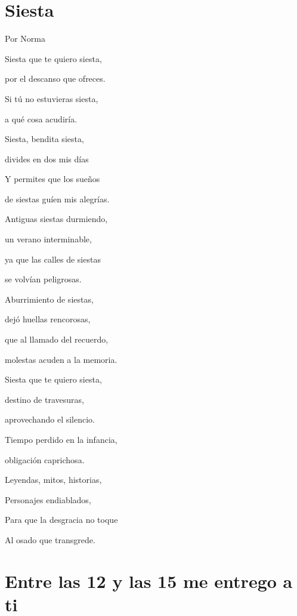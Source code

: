 \documentclass[11pt,twoside,openright,a5paper]{book}
\begin{document}
\section*{Siesta}

                                                                                                                   \begin{flushright}Por Norma\end{flushright}

\begin{center}

Siesta que te quiero siesta,

por el descanso que ofreces.

Si tú no estuvieras siesta,

a qué cosa acudiría.



Siesta, bendita siesta,

divides en dos mis días

Y permites que los sueños

de siestas guíen mis alegrías.



Antiguas siestas durmiendo,

un verano interminable,

ya que las calles de siestas

se volvían peligrosas.



Aburrimiento de siestas,

dejó huellas rencorosas,

que  al llamado del recuerdo,

molestas acuden a la memoria.



Siesta que te quiero siesta,

destino de travesuras,

aprovechando el silencio.

Tiempo perdido en la infancia,

obligación caprichosa.



Leyendas, mitos, historias,

Personajes endiablados,

Para que la desgracia no toque

Al osado que transgrede.
\end{center}

\section*{Entre las 12 y las 15 me entrego a ti}
\end{document}
